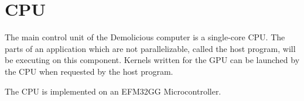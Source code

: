 \documentclass[../main/report.tex]{subfiles}
\begin{document}
\chapter{CPU}

The main control unit of the Demolicious computer is a single-core CPU.
The parts of an application which are not parallelizable, called the host program, will be executing on this component.
Kernels written for the GPU can be launched by the CPU when requested by the host program.

The CPU is implemented on an EFM32GG Microcontroller.










\end{document}
